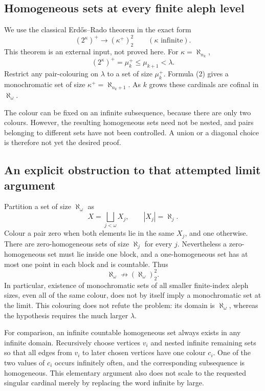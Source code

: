 \subsection*{Homogeneous sets at every finite aleph level}
We use the classical Erd\H{o}s--Rado theorem in the exact form
\[
 (2^\kappa)^+\longrightarrow(\kappa^+)^2_2
 \qquad(\kappa\text{ infinite}).
 \tag{2}
\]
This theorem is an external input, not proved here. For $\kappa=\aleph_{n_k}$,
\[
 (2^\kappa)^+=\mu_k^+\le\mu_{k+1}<\lambda.
\]
Restrict any pair-colouring on $\lambda$ to a set of size $\mu_k^+$. Formula (2) gives a monochromatic set of size
$\kappa^+=\aleph_{n_k+1}$. As $k$ grows these cardinals are cofinal in $\aleph_\omega$.

The colour can be fixed on an infinite subsequence, because there are only two colours. However, the resulting homogeneous sets need not be nested, and pairs belonging to different sets have not been controlled. A union or a diagonal choice is therefore not yet the desired proof.

\subsection*{An explicit obstruction to that attempted limit argument}
Partition a set of size $\aleph_\omega$ as
\[
 X=\bigsqcup_{j<\omega}X_j,\qquad |X_j|=\aleph_j.
\]
Colour a pair zero when both elements lie in the same $X_j$, and one otherwise. There are zero-homogeneous sets of size $\aleph_j$ for every $j$. Nevertheless a zero-homogeneous set must lie inside one block, and a one-homogeneous set has at most one point in each block and is countable. Thus
\[
 \aleph_\omega\not\longrightarrow(\aleph_\omega)^2_2.
\]
In particular, existence of monochromatic sets of all smaller finite-index aleph sizes, even all of the same colour, does not by itself imply a monochromatic set at the limit. This colouring does not refute the problem: its domain is $\aleph_\omega$, whereas the hypothesis requires the much larger $\lambda$.

For comparison, an infinite countable homogeneous set always exists in any infinite domain. Recursively choose vertices $v_i$ and nested infinite remaining sets so that all edges from $v_i$ to later chosen vertices have one colour $c_i$. One of the two values of $c_i$ occurs infinitely often, and the corresponding subsequence is homogeneous. This elementary argument also does not scale to the requested singular cardinal merely by replacing the word infinite by large.

